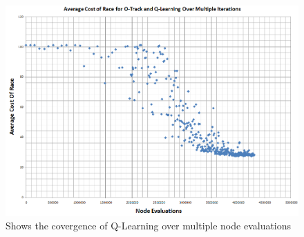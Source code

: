 \documentclass[12pt,letterpaper]{article}
\begin{document}
\begin{figure}
\begin{center}
\includegraphics[width=6.5in]{Q-Learning.png}
\end{center}
\caption{Shows the covergence of Q-Learning over multiple node evaluations}
\label{qlearning}
\end{figure}
\end{document}
